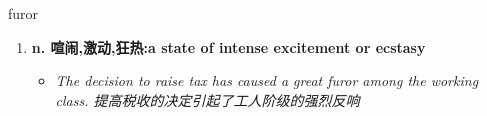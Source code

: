 
\begin{frame}
{\huge furor}
\begin{center}
\begin{enumerate}\Large
  \item \textbf{n. 喧闹,激动,狂热:a state of intense excitement or ecstasy}
  \begin{itemize}
    \item \em{\Large{The decision to raise tax has caused a great furor among the working class. 提高税收的决定引起了工人阶级的强烈反响}}
  \end{itemize}
\end{enumerate}
\end{center}
\end{frame}

